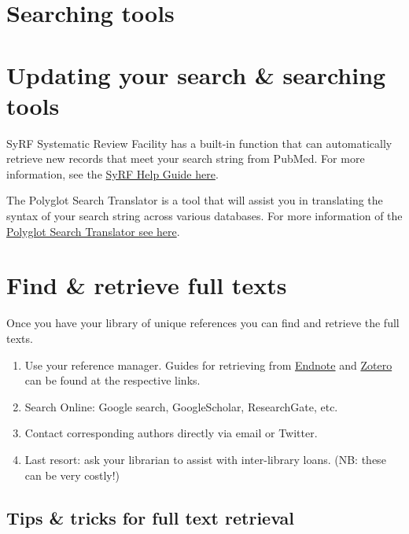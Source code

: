 \documentclass[
]{book}
\providecommand{\tightlist}{%
  \setlength{\itemsep}{0pt}\setlength{\parskip}{0pt}}
\begin{document}
\hypertarget{searching-tools}{%
\section{Searching tools}\label{searching-tools}}

\hypertarget{updating-your-search-searching-tools}{%
\section{Updating your search \& searching tools}\label{updating-your-search-searching-tools}}

SyRF Systematic Review Facility has a built-in function that can automatically retrieve new records that meet your search string from PubMed. For more information, see the \href{https://assets.syrf.org.uk/guides/SyRF_User_Guide.pdf}{SyRF Help Guide here}.

The Polyglot Search Translator is a tool that will assist you in translating the syntax of your search string across various databases. For more information of the \href{https://sr-accelerator.com/\#/polyglot}{Polyglot Search Translator see here}.

\hypertarget{find-retrieve-full-texts}{%
\section{Find \& retrieve full texts}\label{find-retrieve-full-texts}}

Once you have your library of unique references you can find and retrieve the full texts.

\begin{enumerate}
\def\labelenumi{\arabic{enumi}.}
\tightlist
\item
  Use your reference manager. Guides for retrieving from \href{https://subjectguides.library.american.edu/c.php?g=479020\&p=3324236}{Endnote} and \href{https://www.zotero.org/support/locate}{Zotero} can be found at the respective links.
\item
  Search Online: Google search, GoogleScholar, ResearchGate, etc.
\item
  Contact corresponding authors directly via email or Twitter.
\item
  Last resort: ask your librarian to assist with inter-library loans. (NB: these can be very costly!)
\end{enumerate}

\hypertarget{tips-tricks-for-full-text-retrieval}{%
\subsection{Tips \& tricks for full text retrieval}\label{tips-tricks-for-full-text-retrieval}}
\end{document}
